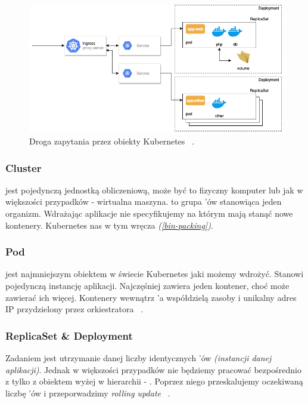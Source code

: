 \begin{figure}[!ht]
	\begin{center}
		\includegraphics[width=1\textwidth]{img/k8s-objects}
	\end{center}
	\caption{Droga zapytania przez obiekty Kubernetes ~\cite{k8s-diagram}.}
\end{figure}

\subsubsection{Cluster}
 jest pojedynczą jednostką obliczeniową, może być to fizyczny komputer lub jak w większości przypadków - wirtualna maszyna. 
 to grupa 'ów stanowiąca jeden organizm. 
Wdrażając aplikacje nie specyfikujemy na którym  mają stanąć nowe kontenery. Kubernetes nas w tym wręcza \emph{(\ref{bin-packing})}.

\subsubsection{Pod}
 jest najmniejszym obiektem w świecie Kubernetes jaki możemy wdrożyć. Stanowi pojedynczą instancję aplikacji. 
Najczęśniej zawiera jeden kontener, choć może zawierać ich więcej. 
Kontenery wewnątrz 'a współdzielą zasoby i unikalny adres IP przydzielony przez orkiestratora ~\cite{k8s-cpts}.

\subsubsection{ReplicaSet \& Deployment}
Zadaniem  jest utrzymanie danej liczby identycznych 'ów \emph{(instancji danej aplikacji)}.
Jednak w większości przypadków nie będziemy pracować bezpośrednio z  tylko z obiektem wyżej w hierarchii - .
Poprzez niego przeskalujemy oczekiwaną liczbę 'ów i przeporwadzimy \emph{rolling update} ~\cite{k8s-cpts}.


